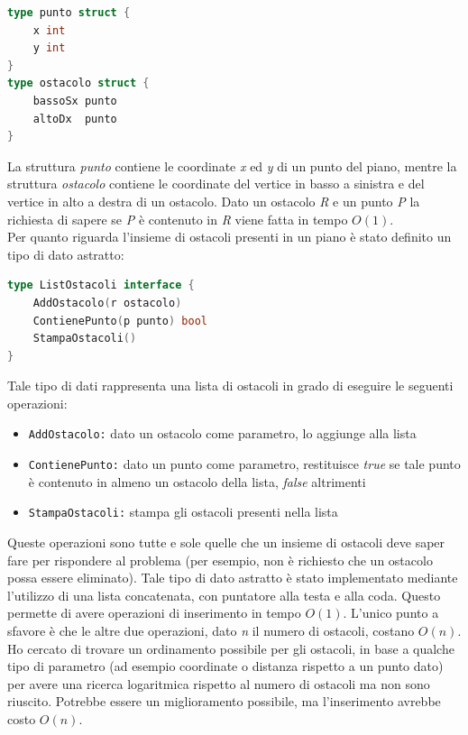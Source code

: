 \documentclass[a4paper,11pt]{article}
\begin{document}
\begin{lstlisting}[language=Go]
type punto struct {
	x int
	y int
}
type ostacolo struct {
	bassoSx punto 
	altoDx  punto
}
\end{lstlisting}

La struttura \textit{punto} contiene le coordinate \textit{x} ed \textit{y} di un punto del piano, mentre la struttura \textit{ostacolo} contiene le coordinate del vertice in basso a sinistra e del vertice in alto a destra di un ostacolo. Dato un ostacolo \textit{R} e un punto \textit{P} la richiesta di sapere se \textit{P} è contenuto in \textit{R} viene fatta in tempo $O(1)$. \\
Per quanto riguarda l'insieme di ostacoli presenti in un piano è stato definito un tipo di dato astratto:

\begin{lstlisting}[language=Go]
type ListOstacoli interface {
	AddOstacolo(r ostacolo)
	ContienePunto(p punto) bool
	StampaOstacoli()
}
\end{lstlisting}

Tale tipo di dati rappresenta una lista di ostacoli in grado di eseguire le seguenti operazioni:

\begin{itemize}
    \item \texttt{AddOstacolo:} dato un ostacolo come parametro, lo aggiunge alla lista

    \item \texttt{ContienePunto:} dato un punto come parametro, restituisce \textit{true} se tale punto è contenuto in almeno un ostacolo della lista, \textit{false} altrimenti

    \item \texttt{StampaOstacoli:} stampa gli ostacoli presenti nella lista
\end{itemize}

Queste operazioni sono tutte e sole quelle che un insieme di ostacoli deve saper fare per rispondere al problema (per esempio, non è richiesto che un ostacolo possa essere eliminato). Tale tipo di dato astratto è stato implementato mediante l'utilizzo di una lista concatenata, con puntatore alla testa e alla coda. Questo permette di avere operazioni di inserimento in tempo $O(1)$. L'unico punto a sfavore è che le altre due operazioni, dato \textit{n} il numero di ostacoli, costano $O(n)$. Ho cercato di trovare un ordinamento possibile per gli ostacoli, in base a qualche tipo di parametro (ad esempio coordinate o distanza rispetto a un punto dato) per avere una ricerca logaritmica rispetto al numero di ostacoli ma non sono riuscito. Potrebbe essere un miglioramento possibile, ma l'inserimento avrebbe costo $O(n)$. 
\end{document}
